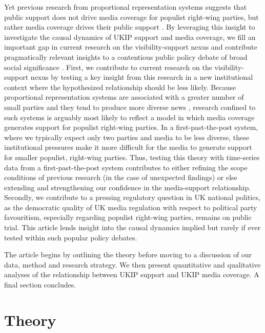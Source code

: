 \documentclass[12pt,]{article}
\begin{document}
Yet previous research from proportional representation systems suggests
that public support does not drive media coverage for populist
right-wing parties, but rather media coverage drives their public
support
\citep{Boomgaarden:2007ia, Boomgaarden:2009ke, vliegenthart_anti-immigrant_2012}.
By leveraging this insight to investigate the causal dynamics of UKIP
support and media coverage, we fill an important gap in current research
on the visibility-support nexus and contribute pragmatically relevant
insights to a contentious public policy debate of broad social
significance \citep{Gerring:2015ub}. First, we contribute to current
research on the visibility-support nexus by testing a key insight from
this research in a new institutional context where the hypothesized
relationship should be less likely. Because proportional representation
systems are associated with a greater number of small parties
\citep{Duverger:1972wk} and they tend to produce more diverse news
\citep{Benson:2009kb, Sheafer:2009hi, Kumlin:2001iq, Stromback:2006ht, Baum:2012je},
research confined to such systems is arguably most likely to reflect a
model in which media coverage generates support for populist right-wing
parties. In a first-past-the-post system, where we typically expect only
two parties and media to be less diverse, these institutional pressures
make it more difficult for the media to generate support for smaller
populist, right-wing parties. Thus, testing this theory with time-series
data from a first-past-the-post system contributes to either refining
the scope conditions of previous research (in the case of unexpected
findings) or else extending and strengthening our confidence in the
media-support relationship. Secondly, we contribute to a pressing
regulatory question in UK national politics, as the democratic quality
of UK media regulation with respect to political party favouritism,
especially regarding populist right-wing parties, remains on public
trial. This article lends insight into the causal dynamics implied but
rarely if ever tested within such popular policy debates.

The article begins by outlining the theory before moving to a discussion
of our data, method and research strategy. We then present quantitative
and qualitative analyses of the relationship between UKIP support and
UKIP media coverage. A final section concludes.

\section{Theory}\label{theory}
\end{document}
